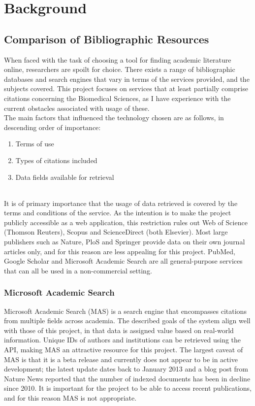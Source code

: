 \documentclass[PROP_AGutteridge_CS.tex]{subfiles}
\begin{document}
\chapter{Background}
\section{Comparison of Bibliographic Resources}
When faced with the task of choosing a tool for finding academic literature online, researchers are spoilt for choice. There exists a range of bibliographic databases and search engines that vary in terms of the services provided, and the subjects covered. This project focuses on services that at least partially comprise citations concerning the Biomedical Sciences, as I have experience with the current obstacles associated with usage of these.\\

\noindent The main factors that influenced the technology chosen are as follows, in descending order of importance:
\begin{enumerate}
\item Terms of use
\item Types of citations included
\item Data fields available for retrieval
\end{enumerate}

\noindent \\ It is of primary importance that the usage of data retrieved is covered by the terms and conditions of the service. As the intention is to make the project publicly accessible as a web application, this restriction rules out Web of Science (Thomson Reuters), Scopus and ScienceDirect (both Elsevier). Most large publishers such as Nature, PloS and Springer provide data on their own journal articles only, and for this reason are less appealing for this project. PubMed, Google Scholar and Microsoft Academic Search are all general-purpose services that can all be used in a non-commercial setting.

\noindent \subsection{Microsoft Academic Search}
Microsoft Academic Search (MAS) is a search engine that encompasses citations from multiple fields across academia. The described goals of the system align well with those of this project, in that data is assigned value based on real-world information\cite{microsoft-help}. Unique IDs of authors and institutions can be retrieved using the API, making MAS an attractive resource for this project. The largest caveat of MAS is that it is a beta release and currently does not appear to be in active development; the latest update dates back to January 2013\cite{microsoft-help} and a blog post from Nature News reported that the number of indexed documents has been in decline since 2010\cite{nature-news}. It is important for the project to be able to access recent publications, and for this reason MAS is not appropriate.
\end{document}
